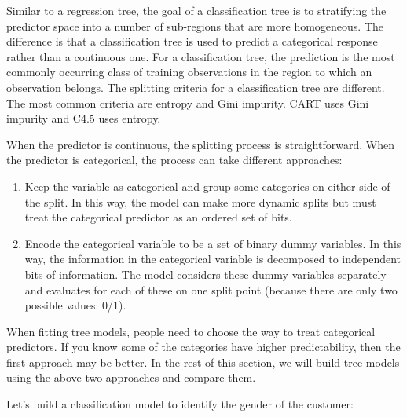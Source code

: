 \documentclass[12pt,]{krantz}
\providecommand{\tightlist}{%
  \setlength{\itemsep}{0pt}\setlength{\parskip}{0pt}}
\begin{document}
Similar to a regression tree, the goal of a classification tree is to stratifying the predictor space into a number of sub-regions that are more homogeneous. The difference is that a classification tree is used to predict a categorical response rather than a continuous one. For a classification tree, the prediction is the most commonly occurring class of training observations in the region to which an observation belongs. The splitting criteria for a classification tree are different. The most common criteria are entropy and Gini impurity. CART uses Gini impurity and C4.5 uses entropy.

When the predictor is continuous, the splitting process is straightforward. When the predictor is categorical, the process can take different approaches:

\begin{enumerate}
\def\labelenumi{\arabic{enumi}.}
\tightlist
\item
  Keep the variable as categorical and group some categories on either side of the split. In this way, the model can make more dynamic splits but must treat the categorical predictor as an ordered set of bits.
\item
  Encode the categorical variable to be a set of binary dummy variables. In this way, the information in the categorical variable is decomposed to independent bits of information. The model considers these dummy variables separately and evaluates for each of these on one split point (because there are only two possible values: 0/1).
\end{enumerate}

When fitting tree models, people need to choose the way to treat categorical predictors. If you know some of the categories have higher predictability, then the first approach may be better. In the rest of this section, we will build tree models using the above two approaches and compare them.

Let's build a classification model to identify the gender of the customer:
\end{document}

